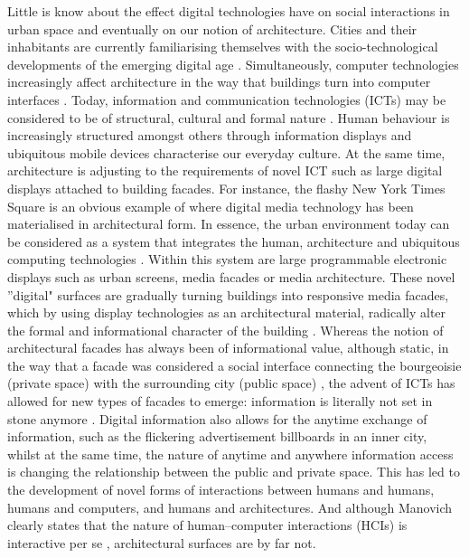 Little is know about the effect digital technologies have on social interactions in urban space and eventually on our notion of architecture. Cities and their inhabitants are currently familiarising themselves with the
socio-technological developments of the emerging digital age \cite{Hemment2013}. Simultaneously, computer technologies increasingly affect architecture in the way that buildings turn into computer interfaces \cite{Mitchell1996}. Today,
information and communication technologies (ICTs) may be considered to be of
structural, cultural and formal nature \cite{Saggio2013}. Human behaviour is increasingly
structured amongst others through information displays and ubiquitous
mobile devices characterise our everyday culture. At the same time, architecture
is adjusting to the requirements of novel ICT such as large digital displays
attached to building facades. For instance, the flashy New York Times Square is
an obvious example of where digital media technology has been materialised in
architectural form. In essence, the urban environment today can be considered as a
system that integrates the human, architecture and ubiquitous computing technologies
\cite{Fatah2006}. Within this system are large programmable electronic
displays such as urban screens, media facades or media architecture.
These novel ''digital" surfaces are gradually turning buildings into responsive media facades, which by using display technologies as an architectural material, radically alter the formal and informational character of the building \cite{Fatah2006}\cite{Ebsen2013}.
Whereas the notion of architectural facades has always been of informational value, although static, in the way that a facade was considered a social interface connecting the bourgeoisie (private space) with the surrounding city (public space) \cite{Neumeyer2002}, the advent of ICTs has allowed for new types of facades to emerge: information is literally not
set in stone anymore \cite{Haeusler2009}. Digital information also allows for the anytime
exchange of information, such as the flickering advertisement billboards in
an inner city, whilst at the same time, the nature of anytime and anywhere information
access is changing the relationship between the public and private space.
This has led to the development of novel forms of interactions between humans
and humans, humans and computers, and humans and architectures. And although
Manovich clearly states that the nature of human–computer interactions (HCIs) is
interactive per se \cite{Manovich2001}, architectural surfaces are by far not.

